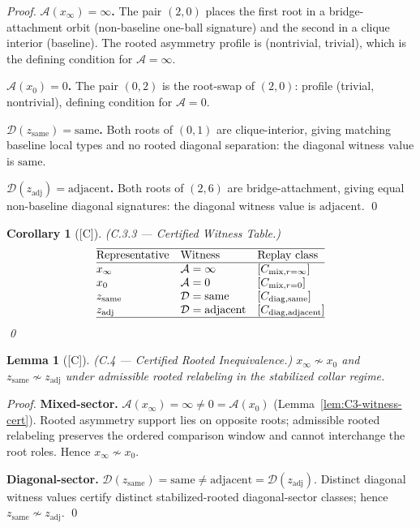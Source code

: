 \documentclass[12pt,oneside]{amsbook}
\theoremstyle{plain}
\newtheorem{lemma}[theorem]{Lemma}
\newtheorem{corollary}[theorem]{Corollary}
\theoremstyle{definition}
\theoremstyle{remark}
\newcommand{\status}[1]{\textup{[#1]}}
\begin{document}
\begin{proof}
\textbf{$\mathcal{A}(x_\infty)=\infty$.}  The pair $(2,0)$ places
the first root in a bridge-attachment orbit (non-baseline one-ball
signature) and the second in a clique interior (baseline).  The
rooted asymmetry profile is (nontrivial, trivial), which is the
defining condition for $\mathcal{A}=\infty$.

\textbf{$\mathcal{A}(x_0)=0$.}  The pair $(0,2)$ is the root-swap of
$(2,0)$: profile (trivial, nontrivial), defining condition for
$\mathcal{A}=0$.

\textbf{$\mathcal{D}(z_{\mathrm{same}})=\mathrm{same}$.}  Both roots
of $(0,1)$ are clique-interior, giving matching baseline local types
and no rooted diagonal separation: the diagonal witness value is
$\mathrm{same}$.

\textbf{$\mathcal{D}(z_{\mathrm{adj}})=\mathrm{adjacent}$.}  Both
roots of $(2,6)$ are bridge-attachment, giving equal non-baseline
diagonal signatures: the diagonal witness value is
$\mathrm{adjacent}$. \qed
\end{proof}

\begin{corollary}[\status{C}]\label{cor:C3-witness-table}
\textup{(C.3.3 --- Certified Witness Table.)}
\[
\begin{array}{@{}lll@{}}
\hline
\text{Representative} & \text{Witness} & \text{Replay class} \\
\hline
x_\infty & \mathcal{A}=\infty & [C_{\mathrm{mix},r=\infty}] \\
x_0      & \mathcal{A}=0      & [C_{\mathrm{mix},r=0}] \\
z_{\mathrm{same}} & \mathcal{D}=\mathrm{same} & [C_{\mathrm{diag,same}}] \\
z_{\mathrm{adj}}  & \mathcal{D}=\mathrm{adjacent} & [C_{\mathrm{diag,adjacent}}] \\
\hline
\end{array}
\]
\qed
\end{corollary}

\begin{lemma}[\status{C}]\label{lem:C4-inequiv}
\textup{(C.4 --- Certified Rooted Inequivalence.)}
$x_\infty \not\sim x_0$ and $z_{\mathrm{same}} \not\sim z_{\mathrm{adj}}$
under admissible rooted relabeling in the stabilized collar regime.
\end{lemma}

\begin{proof}
\textbf{Mixed-sector.}  $\mathcal{A}(x_\infty)=\infty \neq 0 =
\mathcal{A}(x_0)$ (Lemma~\ref{lem:C3-witness-cert}).  Rooted
asymmetry support lies on opposite roots; admissible rooted
relabeling preserves the ordered comparison window and cannot
interchange the root roles.  Hence $x_\infty \not\sim x_0$.

\textbf{Diagonal-sector.}  $\mathcal{D}(z_{\mathrm{same}}) =
\mathrm{same} \neq \mathrm{adjacent} = \mathcal{D}(z_{\mathrm{adj}})$.
Distinct diagonal witness values certify distinct
stabilized-rooted diagonal-sector classes;
hence $z_{\mathrm{same}} \not\sim z_{\mathrm{adj}}$. \qed
\end{proof}
\end{document}
